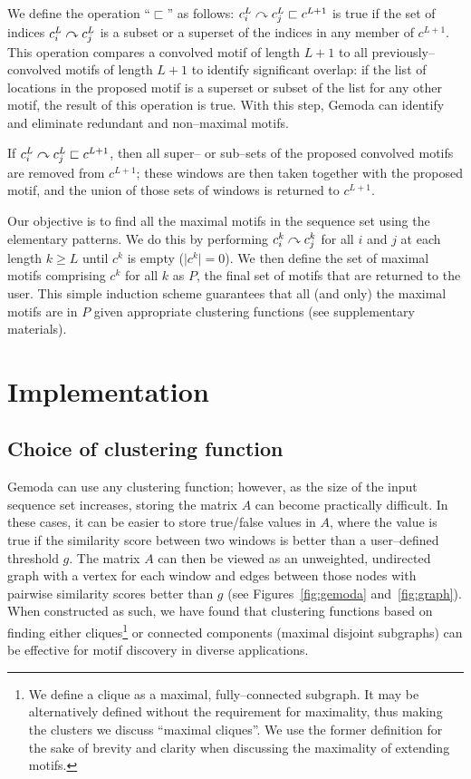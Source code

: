     We define the operation ``$\sqsubset$''
    as follows: $c_i^L \curvearrowright c_j^L \sqsubset c^{L+1}$ is
    true if the set of indices $c_i^L \curvearrowright c_j^L$ is a
    subset or a superset of the indices in any member
    of $c^{L+1}$.  This operation compares a convolved motif of
    length $L+1$ to all previously--convolved motifs of length $L+1$ to
    identify significant overlap: if the list of locations in the
    proposed motif is a superset or subset of the list for
    any other motif, the
    result of this operation is true.  With this step, Gemoda
    can identify and eliminate redundant and non--maximal motifs.

    If $c_i^L \curvearrowright c_j^L \sqsubset c^{L+1}$, then all
    super-- or sub--sets of the proposed convolved
    motifs are removed from $c^{L+1}$; these
    windows are then taken together with the proposed
    motif, and the union of those sets of
    windows is returned to $c^{L+1}$.

    Our objective is to find all the maximal motifs in
    the sequence set using the elementary patterns.
    We do this by performing $c_i^k \curvearrowright c_j^k$
    for all $i$ and $j$ at each length $k \ge L$
    until $c^k$ is empty ($\vert c^k \vert = 0$).
    We then define the set of maximal motifs comprising $c^k$
    for all $k$ as $P$, the final set of motifs that
    are returned to the user.  This simple induction
    scheme guarantees that all (and only) the maximal
    motifs are in $P$ given appropriate clustering
    functions (see supplementary materials).



\section{Implementation}

    \subsection{Choice of clustering function}
    Gemoda can use any clustering function; however,
    as the size of the input sequence set increases,
    storing the matrix $A$ can become practically
    difficult.  In these cases, it can be easier to store
    true/false
    values in $A$, where the value is true if the
    similarity score between two windows is better than
    a user--defined threshold $g$.  The matrix $A$ can
    then be viewed as an unweighted, undirected graph
    with a vertex for each window and edges between
    those nodes with pairwise similarity scores
    better than $g$ (see Figures~\vref{fig:gemoda}
    and~\vref{fig:graph}).  When constructed as such,
    we have found that clustering functions based on
    finding either cliques\footnote{We define a clique
    as a maximal, fully--connected subgraph.  It may
    be alternatively defined without the requirement
    for maximality, thus making the clusters we
    discuss ``maximal cliques''.  We use the former
    definition for the sake of brevity and clarity when
    discussing the maximality of extending motifs.} or
    connected components (maximal disjoint subgraphs)
    can be effective for motif discovery in diverse
    applications.


